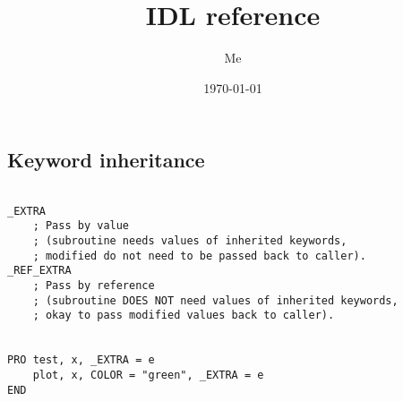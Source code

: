 \documentclass[twocolumn]{article}
\title{IDL reference}
\author{Me}
\date{\today}
\begin{document}
\maketitle

\tableofcontents





\setcounter{secnumdepth}{0}

\clearpage  %


\subsection{Keyword inheritance}
\begin{lstlisting}

_EXTRA
    ; Pass by value
    ; (subroutine needs values of inherited keywords,
    ; modified do not need to be passed back to caller).
_REF_EXTRA
    ; Pass by reference
    ; (subroutine DOES NOT need values of inherited keywords,
    ; okay to pass modified values back to caller).


PRO test, x, _EXTRA = e
    plot, x, COLOR = "green", _EXTRA = e
END
\end{lstlisting}


\end{document}
